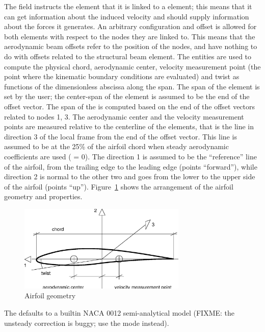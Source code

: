The field  instructs the element that it is linked to a 
 element; this means that it can get information about the
induced velocity and should supply information about the forces it generates.
An arbitrary configuration and offset is allowed for both elements with
respect to the nodes they are linked to. 
This means that the aerodynamic beam offsets refer to the position of the nodes,
and have nothing to do with offsets related to the structural beam element.
The  entities are used to compute the physical chord,
aerodynamic center, velocity measurement point (the point where the
kinematic boundary conditions are evaluated) and twist as functions 
of the dimensionless abscissa along the span.
The span of the  element is set by the user; the
center-span of the element is assumed to be the end of the offset vector.
The span of the  is computed based on the end of the
offset vectors related to nodes 1, 3.
The aerodynamic center and the velocity measurement points are measured
relative to the centerline of the elements, that is the line in direction 3
of the local frame from the end of the offset vector.
This line is assumed to be at the 25\% of the airfoil chord when steady
aerodynamic coefficients are used ( = 0).
The direction 1 is assumed to be the ``reference'' line of the airfoil, 
from the trailing edge to the leading edge (points ``forward''),
while direction 2 is normal to the other two and goes from the lower 
to the upper side of the airfoil (points ``up''). 
Figure~\ref{fig:AIRFOIL} shows the arrangement of the airfoil geometry 
and properties.

\begin{figure}[h]
  \centering
    \includegraphics[width=80mm]{airfoil.eps}
  \caption{Airfoil geometry}\label{fig:AIRFOIL}
\end{figure}

The  defaults to a builtin NACA 0012 semi-analytical
model (FIXME: the unsteady correction is buggy; use the  
mode instead).

